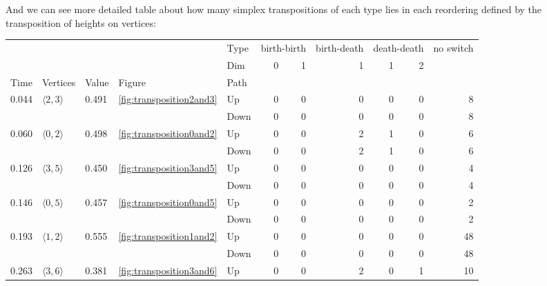 \documentclass{article}
\begin{document}
\par And we can see more detailed table about how many simplex transpositions of each type lies in each reordering defined by the transposition of heights on vertices:
\begin{center}
\begin{tabular}{lllllrrrrrr}
\toprule
 &  &  &  & Type & \multicolumn{2}{r}{birth-birth} & birth-death & \multicolumn{2}{r}{death-death} & no switch \\
 &  &  &  & Dim & 0 & 1 & 1 & 1 & 2 &  \\
Time & Vertices & Value & Figure & Path &  &  &  &  &  &  \\
\midrule
\multirow[t]{2}{*}{0.044} & \multirow[t]{2}{*}{$\langle2, 3\rangle$} & \multirow[t]{2}{*}{0.491} & \multirow[t]{2}{*}{\ref{fig:transposition2and3}} & Up & 0 & 0 & 0 & 0 & 0 & 8 \\
 &  &  &  & Down & 0 & 0 & 0 & 0 & 0 & 8 \\
\cline{1-11} \cline{2-11} \cline{3-11} \cline{4-11}
\multirow[t]{2}{*}{0.060} & \multirow[t]{2}{*}{$\langle0, 2\rangle$} & \multirow[t]{2}{*}{0.498} & \multirow[t]{2}{*}{\ref{fig:transposition0and2}} & Up & 0 & 0 & 2 & 1 & 0 & 6 \\
 &  &  &  & Down & 0 & 0 & 2 & 1 & 0 & 6 \\
\cline{1-11} \cline{2-11} \cline{3-11} \cline{4-11}
\multirow[t]{2}{*}{0.126} & \multirow[t]{2}{*}{$\langle3, 5\rangle$} & \multirow[t]{2}{*}{0.450} & \multirow[t]{2}{*}{\ref{fig:transposition3and5}} & Up & 0 & 0 & 0 & 0 & 0 & 4 \\
 &  &  &  & Down & 0 & 0 & 0 & 0 & 0 & 4 \\
\cline{1-11} \cline{2-11} \cline{3-11} \cline{4-11}
\multirow[t]{2}{*}{0.146} & \multirow[t]{2}{*}{$\langle0, 5\rangle$} & \multirow[t]{2}{*}{0.457} & \multirow[t]{2}{*}{\ref{fig:transposition0and5}} & Up & 0 & 0 & 0 & 0 & 0 & 2 \\
 &  &  &  & Down & 0 & 0 & 0 & 0 & 0 & 2 \\
\cline{1-11} \cline{2-11} \cline{3-11} \cline{4-11}
\multirow[t]{2}{*}{0.193} & \multirow[t]{2}{*}{$\langle1, 2\rangle$} & \multirow[t]{2}{*}{0.555} & \multirow[t]{2}{*}{\ref{fig:transposition1and2}} & Up & 0 & 0 & 0 & 0 & 0 & 48 \\
 &  &  &  & Down & 0 & 0 & 0 & 0 & 0 & 48 \\
\cline{1-11} \cline{2-11} \cline{3-11} \cline{4-11}
\multirow[t]{2}{*}{0.263} & \multirow[t]{2}{*}{$\langle3, 6\rangle$} & \multirow[t]{2}{*}{0.381} & \multirow[t]{2}{*}{\ref{fig:transposition3and6}} & Up & 0 & 0 & 2 & 0 & 1 & 10 \\

\end{tabular}
\end{center}
\end{document}
